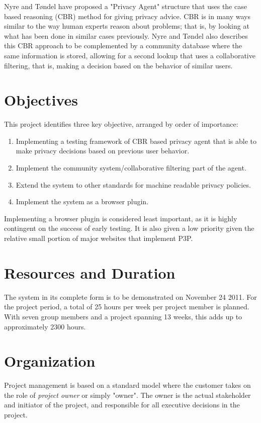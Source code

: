 Nyre and T{\o}ndel have proposed a "Privacy Agent" structure that uses the case based reasoning (CBR) method for giving privacy advice. CBR is in many ways similar to the way human experts reason about problems; that is, by looking at what has been done in similar cases previously. Nyre and T{\o}ndel also describes this CBR approach to be complemented by a community database where the same information is stored, allowing for a second lookup that uses a collaborative filtering, that is, making a decision based on the behavior of similar users. 

\section{Objectives}
This project identifies three key objective, arranged by order of importance:

\begin{enumerate}
\item Implementing a testing framework of CBR based privacy agent that is able to make privacy decisions based on previous user behavior.
\item Implement the community system/collaborative filtering part of the agent.
\item Extend the system to other standards for machine readable privacy policies.
\item Implement the system as a browser plugin. 
\end{enumerate}

Implementing a browser plugin is considered least important, as it is highly contingent on the success of early testing. It is also given a low priority given the relative small portion of major websites that implement P3P.


\section{Resources and Duration}
The system in its complete form is to be demonstrated on November 24 2011. For the project period, a total of 25 hours per week per project member is planned. With seven group members and a project spanning 13 weeks, this adds up to approximately 2300 hours.


\section{Organization}
Project management is based on a standard model where the customer takes on the role of \emph{project owner} or simply "owner". The owner is the actual stakeholder and initiator of the project, and responsible for all executive decisions in the project. 

